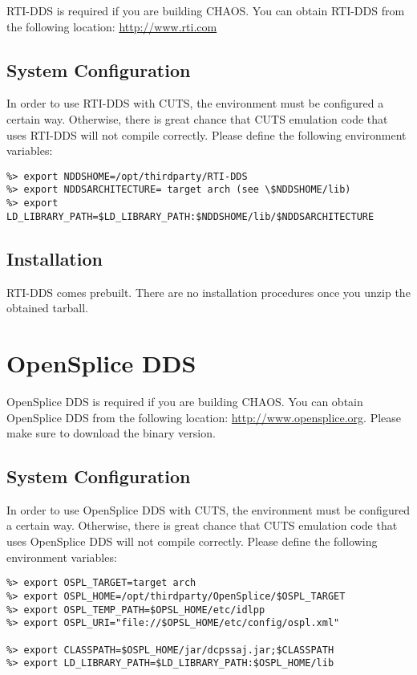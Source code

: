 RTI-DDS is required if you are building CHAOS. You can obtain RTI-DDS
from the following location: \url{http://www.rti.com}

\subsection{System Configuration}
In order to use RTI-DDS with CUTS, the environment must be configured 
a certain way. Otherwise, there is great chance that CUTS emulation 
code that uses RTI-DDS will not compile correctly. Please define the 
following environment variables:
\begin{lstlisting}
%> export NDDSHOME=/opt/thirdparty/RTI-DDS
%> export NDDSARCHITECTURE= target arch (see \$NDDSHOME/lib)
%> export LD_LIBRARY_PATH=$LD_LIBRARY_PATH:$NDDSHOME/lib/$NDDSARCHITECTURE
\end{lstlisting}

\subsection{Installation}

RTI-DDS comes prebuilt. There are no installation procedures 
once you unzip the obtained tarball.

\section{OpenSplice DDS}
\label{sec:thirdparty-ospl}

OpenSplice DDS is required if you are building CHAOS. You can obtain 
OpenSplice DDS from the following location: \url{http://www.opensplice.org}.
Please make sure to download the binary version.

\subsection{System Configuration}

In order to use OpenSplice DDS with CUTS, the environment must be configured 
a certain way. Otherwise, there is great chance that CUTS emulation 
code that uses OpenSplice DDS will not compile correctly. Please define the 
following environment variables:
\begin{lstlisting}
%> export OSPL_TARGET=target arch
%> export OSPL_HOME=/opt/thirdparty/OpenSplice/$OSPL_TARGET
%> export OSPL_TEMP_PATH=$OPSL_HOME/etc/idlpp
%> export OSPL_URI="file://$OPSL_HOME/etc/config/ospl.xml"

%> export CLASSPATH=$OSPL_HOME/jar/dcpssaj.jar;$CLASSPATH
%> export LD_LIBRARY_PATH=$LD_LIBRARY_PATH:$OSPL_HOME/lib
\end{lstlisting}

